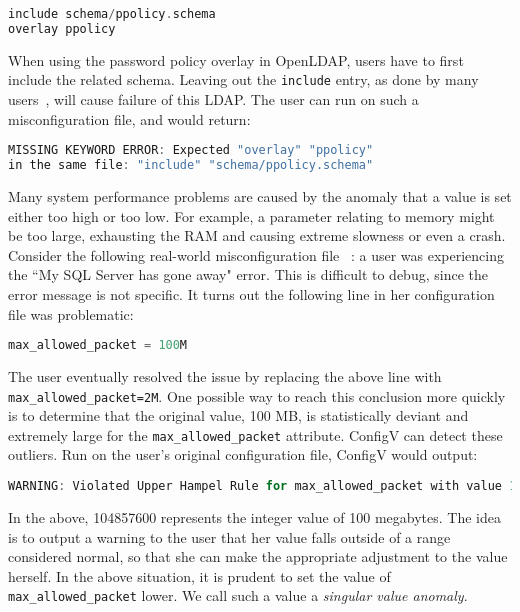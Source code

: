 \begin{lstlisting}[language=C, xleftmargin=.01\textwidth]
include schema/ppolicy.schema
overlay ppolicy
\end{lstlisting} 

When using the password policy overlay in OpenLDAP, 
users have to first include the related schema.
Leaving out the {\tt include} entry, 
as done by many users~\cite{yin11anempirical}, 
will cause failure of this LDAP. 
The user can run \app on such a misconfiguration file,
and \app would return:

\begin{lstlisting}[language=C, xleftmargin=.01\textwidth]
MISSING KEYWORD ERROR: Expected "overlay" "ppolicy"
in the same file: "include" "schema/ppolicy.schema"
\end{lstlisting} 

Many system performance problems are caused by the
anomaly that a value is set either too high or too low.
For example, a parameter relating to memory might be too large,
exhausting the RAM and causing extreme slowness or even a crash. 
Consider the following real-world misconfiguration file%
~\cite{singleValue}: a user was experiencing the ``My SQL Server 
has gone away" error.  
This is difficult to debug, since the error message is not specific.
It turns out the following line in her configuration file was problematic:

\begin{lstlisting}[language=C, xleftmargin=.01\textwidth]
max_allowed_packet = 100M
\end{lstlisting} 

The user eventually resolved the issue by replacing the above line with {\tt max\_allowed\_packet=2M}.
One possible way to reach this conclusion more quickly is to determine that the original value, 100 MB, 
is statistically deviant and extremely large for the {\tt max\_allowed\_packet} attribute. 
ConfigV can detect these
outliers. Run on the user's original configuration file, ConfigV would output:

\begin{lstlisting}[language=C, xleftmargin=.01\textwidth]
WARNING: Violated Upper Hampel Rule for max_allowed_packet with value 104857600 
\end{lstlisting} 

In the above, 104857600 represents the integer value of 100 megabytes. The idea is to output
a warning to the user that her value falls outside of a range considered normal, so that she
can make the appropriate adjustment to the value herself. In the above situation, it is 
prudent to set the value of {\tt max\_allowed\_packet} lower. We call such a value a 
\emph{singular value anomaly}.

